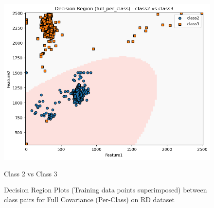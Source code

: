 \begin{figure}[H]
\begin{minipage}{0.32\linewidth}
        \includegraphics[width=\linewidth]{images/RD_Group04_images/04_full_per_class/04_decision_region_c2_c3.png}
        \caption*{Class 2 vs Class 3}
    \end{minipage}
    \caption{Decision Region Plots (Training data points superimposed) between class pairs for Full Covariance (Per-Class) on RD dataset}
\end{figure}